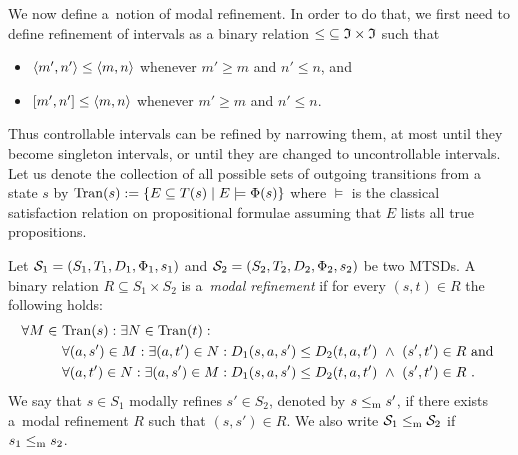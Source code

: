 We now define a~notion of modal refinement. In order to do that, we
first need to define refinement of intervals as a binary relation
$\mathord{\leq} \subseteq \mathfrak I \times \mathfrak I$ such that
\begin{itemize}
\item $\langle m',n'\rangle\leq \langle m,n\rangle$ whenever $m' \ge m$ and $n' \le n$, and
\item $[m',n'] \leq \langle m,n\rangle$ whenever $m' \ge m$ and $n' \le n$.
\end{itemize}
Thus controllable intervals can be refined by narrowing them, 
at most until they become singleton intervals, or  until they are 
changed to uncontrollable intervals. 
Let us denote the collection of all possible sets of outgoing transitions from a state $s$ by
$\mathrm{Tran}(s) := \{ E \subseteq T(s) \mid E \models \Phi(s) \}$ where
$\models$ is the classical satisfaction relation on propositional
formulae assuming that $E$ lists all true propositions.

\begin{definition}
Let $\mathcal S_1 = (S_1,T_1,D_1,\Phi_1,s_1)$ and $\mathcal S_2 = (S_2,T_2,D_2,\Phi_2,s_2)$ be two MTSDs.
A binary relation
$R \subseteq S_1 \times S_2$ is a~\emph{modal refinement} if
for every $(s,t) \in R$ the following holds:
\begin{align*} 
 \forall M \in & \ \val(s) : \exists N \in \val(t) : \\
& \ \forall (a,s') \in M : \exists (a,t') \in N : 
D_1(s,a,s') \leq D_2(t,a,t')
\ \wedge\ 
(s',t') \in R  \text{ and }
\\
& \ \forall (a,t') \in N : \exists (a,s') \in M : 
D_1(s,a,s') \leq D_2(t,a,t')
\ \wedge\ 
(s',t') \in R \ .
\end{align*}
We say that $s \in S_1$ modally refines $s' \in S_2$, 
denoted by $s \le_\mathrm m s'$, if there
exists a~modal refinement $R$ such that $(s,s') \in R$.
We also write $\mathcal S_1 \le_\mathrm m \mathcal S_2$ if $s_1 \le_\mathrm m s_2$.
\end{definition}


